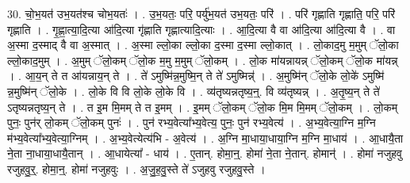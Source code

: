 \documentclass[17pt]{extarticle}
\begin{document}
30. चो॒भ॒यत॑ उभ॒यत॑श्च चोभ॒यतः॑ । . उ॒भ॒यतः॒ परि॒ पर्यु॑भ॒यत॑ उभ॒यतः॒ परि॑ । . परि॑ गृह्णाति गृह्णाति॒ परि॒ परि॑ गृह्णाति । . गृ॒ह्णा॒त्या॒दि॒त्या आ॑दि॒त्या गृ॑ह्णाति गृह्णात्यादि॒त्याः । . आ॒दि॒त्या वै वा आ॑दि॒त्या आ॑दि॒त्या वै । . वा अ॒स्मा द॒स्माद् वै वा अ॒स्मात् । . अ॒स्मा ल्लो॒का ल्लो॒का द॒स्मा द॒स्मा ल्लो॒कात् । . लो॒काद॒मु म॒मुम् ॅलो॒का ल्लो॒काद॒मुम् । . अ॒मुम् ॅलो॒कम् ॅलो॒क म॒मु म॒मुम् ॅलो॒कम् । . लो॒क मा॑यन्नायन्न् ॅलो॒कम् ॅलो॒क मा॑यन्न् । . आ॒य॒न् ते त आ॑यन्नाय॒न् ते । . ते॑ ऽमुष्मि॑न्न॒मुष्मि॒न् ते ते॑ ऽमुष्मिन्न्॑ । . अ॒मुष्मि॑न् ॅलो॒के लो॒के॑ ऽमुष्मि॑ न्न॒मुष्मि॑न् ॅलो॒के । . लो॒के वि वि लो॒के लो॒के वि । . व्य॑तृष्यन्नतृष्य॒न्॒. वि व्य॑तृष्यन्न् । . अ॒तृ॒ष्य॒न् ते ते॑ ऽतृष्यन्नतृष्य॒न् ते । . त इ॒म मि॒मम् ते त इ॒मम् । . इ॒मम् ॅलो॒कम् ॅलो॒क मि॒म मि॒मम् ॅलो॒कम् । . लो॒कम् पुनः॒ पुन॑र् लो॒कम् ॅलो॒कम् पुनः॑ । . पुन॑ रभ्य॒वेत्या᳚भ्य॒वेत्य॒ पुनः॒ पुन॑ रभ्य॒वेत्य॑ । . अ॒भ्य॒वेत्या॒ग्नि म॒ग्नि म॑भ्य॒वेत्या᳚भ्य॒वेत्या॒ग्निम् । . अ॒भ्य॒वेत्येत्य॑भि - अ॒वेत्य॑ । . अ॒ग्नि मा॒धाया॒धाया॒ग्नि म॒ग्नि मा॒धाय॑ । . आ॒धायै॒ता ने॒ता ना॒धाया॒धायै॒तान् । . आ॒धायेत्या᳚ - धाय॑ । . ए॒तान्. होमा॒न्॒. होमा॑ ने॒ता ने॒तान्. होमान्॑ । . होमा॑ नजुहवु रजुहवु॒र्॒. होमा॒न्॒. होमा॑ नजुहवुः । . अ॒जु॒ह॒वु॒स्ते ते॑ ऽजुहवु रजुहवु॒स्ते । \newline
\end{document}
